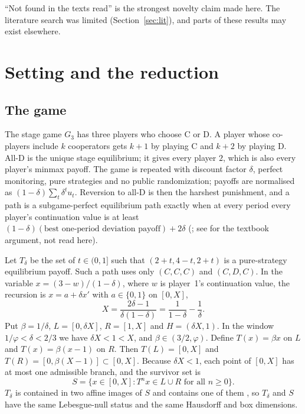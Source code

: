 \documentclass[11pt]{amsart}
\theoremstyle{remark}
\begin{document}
``Not found in the texts read'' is the strongest novelty claim made here. The literature search was limited (Section~\ref{sec:lit}), and parts of these results may exist elsewhere.

\section{Setting and the reduction}\label{sec:setting}

\subsection{The game}
The stage game $G_3$ has three players who choose C or D. A player whose co-players include $k$ cooperators gets $k+1$ by playing C and $k+2$ by playing D. All-D is the unique stage equilibrium; it gives every player $2$, which is also every player's minmax payoff. The game is repeated with discount factor $\delta$, perfect monitoring, pure strategies and no public randomization; payoffs are normalised as $(1-\delta)\sum_t\delta^t u_t$. Reversion to all-D is then the harshest punishment, and a path is a subgame-perfect equilibrium path exactly when at every period every player's continuation value is at least $(1-\delta)(\text{best one-period deviation payoff})+2\delta$ (\cite{v1}; see \cite{MS06} for the textbook argument, not read here).

Let $T_\delta$ be the set of $t\in(0,1]$ such that $(2+t,4-t,2+t)$ is a pure-strategy equilibrium payoff. Such a path uses only $(C,C,C)$ and $(C,D,C)$. In the variable $x=(3-w)/(1-\delta)$, where $w$ is player~1's continuation value, the recursion is $x=a+\delta x'$ with $a\in\{0,1\}$ on $[0,X]$,
\[
X=\frac{2\delta-1}{\delta(1-\delta)}=\frac{1}{1-\delta}-\frac1\delta .
\]
Put $\beta=1/\delta$, $L=[0,\delta X]$, $R=[1,X]$ and $H=(\delta X,1)$. In the window $1/\varphi<\delta<2/3$ we have $\delta X<1<X$, and $\beta\in(3/2,\varphi)$. Define $T(x)=\beta x$ on $L$ and $T(x)=\beta(x-1)$ on $R$. Then $T(L)=[0,X]$ and $T(R)=[0,\beta(X-1)]\subset[0,X]$. Because $\delta X<1$, each point of $[0,X]$ has at most one admissible branch, and the survivor set is
\[
S=\{x\in[0,X]: T^n x\in L\cup R \text{ for all } n\ge 0\}.
\]
$T_\delta$ is contained in two affine images of $S$ and contains one of them \cite{note}, so $T_\delta$ and $S$ have the same Lebesgue-null status and the same Hausdorff and box dimensions.
\end{document}
